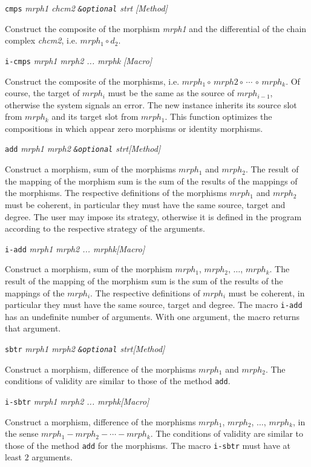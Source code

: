 \newpage
{\parindent=0mm
{\leftskip=5mm
{\tt cmps} {\em mrph1 chcm2 {\tt \&optional} strt} \hfill{\em [Method]}\par }
{\leftskip=15mm
Construct the composite of the morphism {\em mrph1} and the differential of the chain complex {\em chcm2},
i.e. $mrph_1 \circ d_2$. \par}
{\leftskip=5mm
{\tt i-cmps} {\em mrph1 mrph2 ... mrphk} \hfill{\em [Macro]}\par }
{\leftskip=15mm
Construct the  composite of the morphisms, i.e. $mrph_1 \circ\, mrph2 \circ\, \cdots\, \circ\, mrph_k$. 
Of course, the target of $mrph_i$ must be the same as the source of $mrph_{i-1}$, otherwise the
system signals an error. The new instance  inherits
its source slot from $mrph_k$ and its target slot from $mrph_1$. This function optimizes
the compositions in which appear zero morphisms or identity morphisms. \par}
{\leftskip=5mm
{\tt add} {\em mrph1 mrph2 {\tt \&optional} strt}\hfill {\em [Method]}  \par }
{\leftskip=15mm
Construct a morphism, sum  of the  morphisms $mrph_1$ and  $mrph_2$.  The result of the mapping
of the morphism sum is the sum of the results of the mappings of the morphisms.
The respective definitions of the morphisms $mrph_1$ and  $mrph_2$  must be coherent, 
in particular they must have the same  source, target and degree. The user may impose
its strategy, otherwise it is defined in the program according to the respective
strategy of the arguments.\par}
{\leftskip=5mm
{\tt i-add} {\em mrph1 mrph2 ... mrphk}\hfill {\em [Macro]}  \par }
{\leftskip=15mm
Construct a morphism, sum  of the  morphism $mrph_1$,  $mrph_2$, $\ldots$, $mrph_k$.  The result of the mapping
of the morphism sum is the sum of the results of the mappings of the $mrph_i$.
The respective definitions of $mrph_i$ must be coherent, in particular they must have the same 
source, target and degree. The macro {\tt i-add} has an undefinite number of arguments.
With one argument, the macro returns that argument.\par}
{\leftskip=5mm
{\tt sbtr} {\em mrph1 mrph2 {\tt \&optional} strt}\hfill {\em [Method]}  \par }
{\leftskip=15mm
Construct a morphism, difference  of the  morphisms $mrph_1$ and  $mrph_2$. The conditions of validity are 
similar to those of the method {\tt add}. \par}
{\leftskip=5mm
{\tt i-sbtr} {\em mrph1 mrph2 ... mrphk}\hfill {\em [Macro]}  \par }
{\leftskip=15mm
Construct a morphism, difference  of the  morphisms $mrph_1$,  $mrph_2$, $\ldots$, $mrph_k$, in the sense
$mrph_1 -  mrph_2 - \cdots - mrph_k$. The conditions of validity are similar to those of the method
{\tt add} for the morphisms. The macro {\tt i-sbtr} must have at least $2$ arguments.  \par}
}

